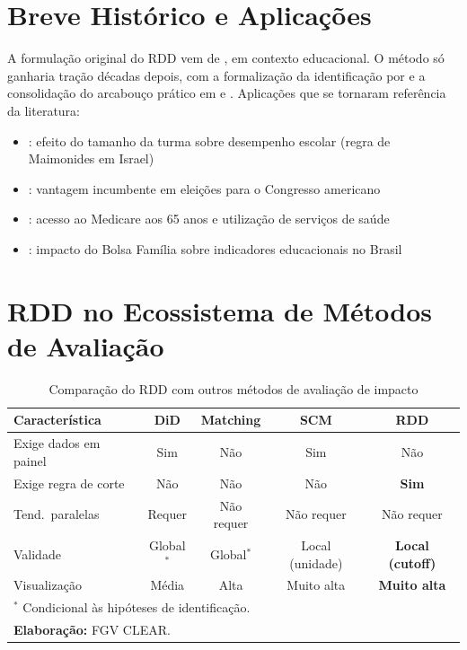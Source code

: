 \documentclass[12pt, a4paper, openany]{book}
\begin{document}
\section{Breve Hist\'orico e Aplica\c{c}\~oes}

A formula\c{c}\~ao original do RDD vem de \cite{ThistlethwaiteCampbell1960}, em contexto educacional. O m\'etodo s\'o ganharia tra\c{c}\~ao d\'ecadas depois, com a formaliza\c{c}\~ao da identifica\c{c}\~ao por \cite{Hahn2001} e a consolida\c{c}\~ao do arcabou\c{c}o pr\'atico em \cite{ImbensLemieux2008} e \cite{LeeLemieux2010}. Aplica\c{c}\~oes que se tornaram refer\^encia da literatura:

\begin{itemize}[leftmargin=1.5cm, itemsep=2pt]
  \item \cite{AngristLavy1999}: efeito do tamanho da turma sobre desempenho escolar (regra de Maimonides em Israel)
  \item \cite{Lee2008}: vantagem incumbente em elei\c{c}\~oes para o Congresso americano
  \item \cite{Card2008}: acesso ao Medicare aos 65 anos e utiliza\c{c}\~ao de servi\c{c}os de sa\'ude
  \item \cite{Romero2009}: impacto do Bolsa Fam\'ilia sobre indicadores educacionais no Brasil
\end{itemize}

\section{RDD no Ecossistema de M\'etodos de Avalia\c{c}\~ao}

\begin{table}[H]
\centering
\caption{Compara\c{c}\~ao do RDD com outros m\'etodos de avalia\c{c}\~ao de impacto}
\label{tab:ecossistema}
\small
\begin{tabular}{lcccc}
\toprule
\textbf{Caracter\'istica} & \textbf{DiD} & \textbf{Matching} & \textbf{SCM} & \textbf{RDD} \\
\midrule
Exige dados em painel  & Sim        & N\~ao          & Sim            & N\~ao \\
Exige regra de corte   & N\~ao      & N\~ao          & N\~ao          & \textbf{Sim} \\
Tend.\ paralelas       & Requer     & N\~ao requer   & N\~ao requer   & N\~ao requer \\
Validade               & Global$^*$ & Global$^*$     & Local (unidade) & \textbf{Local (cutoff)} \\
Visualiza\c{c}\~ao     & M\'edia    & Alta           & Muito alta      & \textbf{Muito alta} \\
\bottomrule
\multicolumn{5}{l}{\footnotesize $^*$ Condicional \`as hip\'oteses de identifica\c{c}\~ao.} \\
\multicolumn{5}{l}{\footnotesize \textbf{Elabora\c{c}\~ao:} FGV CLEAR.}
\end{tabular}
\end{table}
\end{document}
